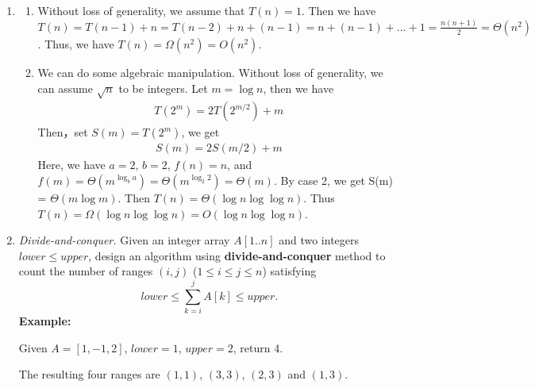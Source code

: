 \documentclass[12pt,a4paper]{article}
\makeatletter
\newtheorem*{solution}{Solution}
\theoremstyle{definition}
\renewenvironment{solution}[1][Solution] {\par\pushQED{\qed}\normalfont\topsep6\p@\@plus6\p@\relax\trivlist\item[\hskip\labelsep\bfseries#1\@addpunct{.}]\ignorespaces}{\popQED\endtrivlist\@endpefalse} \makeatother
\makeatother
\begin{document}
\begin{enumerate}
\begin{solution}
\begin{enumerate}
	    \item Without loss of generality, we assume that $T(n) = 1$. Then we have $T(n) = T(n-1) + n = T(n-2) + n +(n-1) = n + (n-1) + \dots + 1 = \frac{n(n+1)}{2}  = \Theta(n^2)$. Thus, we have $T(n) = \Omega(n^2)= O(n^2)$.
	    \item We can do some algebraic manipulation. Without loss of generality, we can assume $\sqrt{n}$ to be integers. Let $m = \log n$, then we have
	    \begin{align*}
	        T(2^m) = 2T(2^{m/2})+m 
	    \end{align*}
	    Then，set $S(m) = T(2^m)$, we get
	    \begin{align*}
	        S(m)= 2S(m/2)+m 
	    \end{align*}
	    Here, we have $a = 2$, $b=2$, $f(n) = n$, and $f(m) = \Theta(m^{\log_{b}{a}}) = \Theta(m^{\log_{2}{2}}) = \Theta(m)$. By case 2, we get S(m) = $\Theta(m\log m)$. Then $T(n) =\Theta( \log n \log\log n)$. Thus $T(n) = \Omega( \log n \log\log n) = O( \log n \log\log n)$.
	\end{enumerate}
\end{solution}
\item
\textit{Divide-and-conquer.} Given an integer array $A[1..n]$ and two integers $lower \le upper$, design an algorithm using \textbf{divide-and-conquer} method to count the number of ranges $(i,j)$ ($1 \leq i \leq j \leq n$) satisfying
$$
    lower \leq \sum_{k=i}^{j}{A[k]} \leq upper.
$$
\textbf{Example:}

Given $A = [1,-1,2]$, $lower = 1$, $upper = 2$, return 4.

The resulting four ranges are $(1,1)$, $(3,3)$, $(2,3)$ and $(1,3)$.


\end{enumerate}
\end{document}
